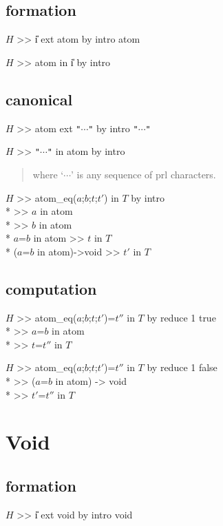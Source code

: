 \subsection*{formation}
\goal $H$ >> \U{i} ext atom by intro atom 

\goal $H$ >> atom in \U{i}  by intro

\subsection*{canonical}
\goal $H$ >> atom ext \verb+"+$\cdots$\verb+"+ by intro \verb+"+$\cdots$\verb+"+

\goal $H$ >> \verb+"+$\cdots$\verb+"+ in atom by intro
\begin{quote}\rm
where `$\cdots$' is any sequence of prl characters.


\end{quote}

\goalskip

\goal $H$ >> atom\_eq($a$;$b$;$t$;$t'$) in $T$ by intro \\*
\subgoal >> $a$ in atom \\*
\subgoal >> $b$ in atom \\*
\subgoal $a$=$b$ in atom >> $t$ in $T$ \\*
\subgoal  ($a$=$b$ in atom)->void >> $t'$ in $T$

\subsection*{computation}
\goalgroup $H$ >> atom\_eq($a$;$b$;$t$;$t'$)=$t''$ in $T$ by reduce 1 true \\*
\subgoal >> $a$=$b$ in atom \\*
\subgoal >> $t$=$t''$ in $T$

\goalskip

\goal $H$ >> atom\_eq($a$;$b$;$t$;$t'$)=$t''$ in $T$ by reduce 1 false \\*
\subgoal >> ($a$=$b$ in atom) -> void \\*
\subgoal >> $t'$=$t''$ in $T$


\section{Void}
\subsection*{formation}

\goal $H$ >> \U{i} ext void by intro void 


